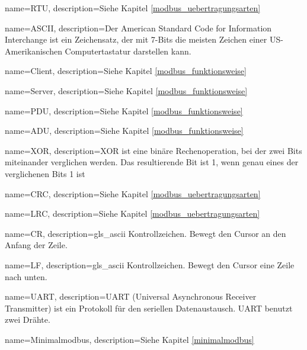 {
	name=RTU,
	description={Siehe Kapitel \ref{modbus_uebertragungsarten} }
}

{
	name=ASCII,
	description={Der American Standard Code for Information Interchange ist ein Zeichensatz, der mit 7-Bits die meisten Zeichen einer US-Amerikanischen Computertastatur darstellen kann. \cite[vgl.][]{seo_kueche_ascii:o.J.}}
}

{
	name=Client,
	description={Siehe Kapitel \ref{modbus_funktionsweise} }
}

{
	name=Server,
	description={Siehe Kapitel \ref{modbus_funktionsweise} }
}

{
	name=PDU,
	description={Siehe Kapitel \ref{modbus_funktionsweise} }
}

{
	name=ADU,
	description={Siehe Kapitel \ref{modbus_funktionsweise} }
}

{
	name=XOR,
	description={XOR ist eine binäre Rechenoperation, bei der zwei Bits miteinander verglichen werden. Das resultierende Bit ist 1, wenn genau eines der verglichenen Bits 1 ist}
}

{
	name=CRC,
	description={Siehe Kapitel \ref{modbus_uebertragungsarten} }
}

{
	name=LRC,
	description={Siehe Kapitel \ref{modbus_uebertragungsarten} }
}

{
	name=CR,
	description={\gls{gls_ascii} Kontrollzeichen. Bewegt den Cursor an den Anfang der Zeile. \cite[vgl.][]{Mozilla_CRLF:2023}}
}

{
	name=LF,
	description={\gls{gls_ascii} Kontrollzeichen. Bewegt den Cursor eine Zeile nach unten. \cite[vgl.][]{Mozilla_CRLF:2023}}
}

{
	name=UART,
	description={UART (Universal Asynchronous Receiver Transmitter) ist ein Protokoll für den seriellen Datenaustausch. UART benutzt zwei Drähte. \cite[vgl.][]{rohde:o.J.}}
}

{
	name=Minimalmodbus,
	description={Siehe Kapitel \ref{minimalmodbus} }
}


